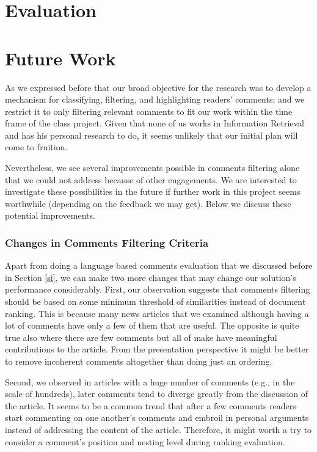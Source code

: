 \documentclass[article]{IEEEtran}
\begin{document}
\section{Evaluation}
\label{ev}

\section{Future Work}
\label{fw}
As we expressed before that our broad objective for the research was to develop a mechanism for classifying, filtering, and highlighting readers' comments; and we restrict it to only filtering relevant comments to fit our work within the time frame of the class project. Given that none of us works in Information Retrieval and has his personal research to do, it seems unlikely that our initial plan will come to fruition.

Nevertheless, we see several improvements possible in comments filtering alone that we could not address because of other engagements. We are interested to investigate these possibilities in the future if further work in this project seems worthwhile (depending on the feedback we may get). Below we discuss these potential improvements.       

\subsubsection{Changes in Comments Filtering Criteria}
Apart from doing a language based comments evaluation that we discussed before in Section \ref{si}, we can make two more changes that may change our solution's performance considerably. First, our observation suggests that comments filtering should be based on some minimum threshold of similarities instead of document ranking. This is because many news articles that we examined although having a lot of comments have only a few of them that are useful. The opposite is quite true also where there are few comments but all of make have meaningful contributions to the article. From the presentation perspective it might be better to remove incoherent comments altogether than doing just an ordering.

Second, we observed in articles with a huge number of comments (e.g., in the scale of hundreds), later comments tend to diverge greatly from the discussion of the article. It seems to be a common trend that after a few comments readers start commenting on one another's comments and embroil in personal arguments instead of addressing the content of the article. Therefore, it might worth a try to consider a comment's position and nesting level during ranking evaluation.            
\end{document}
